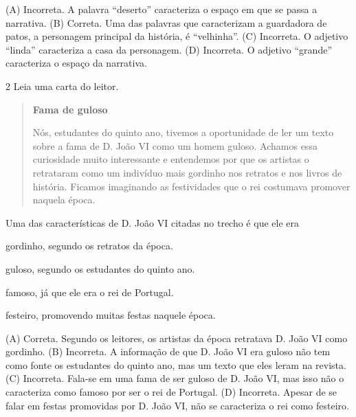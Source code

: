 
(A) Incorreta. A palavra ``deserto'' caracteriza o espaço em que se
passa a narrativa.
(B) Correta. Uma das palavras que caracterizam a
guardadora de patos, a personagem principal da história, é ``velhinha''.
(C) Incorreta. O adjetivo ``linda'' caracteriza a casa da personagem.
(D) Incorreta. O adjetivo ``grande'' caracteriza o espaço da narrativa.

\num{2} Leia uma carta do leitor.

\begin{quote}
\textbf{Fama de guloso}

Nós, estudantes do quinto ano, tivemos a oportunidade de ler um texto sobre a fama de D. João VI como um homem guloso. Achamos essa curiosidade muito interessante e entendemos por que os artistas o retrataram como um indivíduo mais gordinho nos retratos e nos livros de história. Ficamos imaginando as festividades que o rei costumava promover naquela época.

\end{quote}

Uma das características de D. João VI citadas no trecho é que ele era

\begin{escolha}
\item gordinho, segundo os retratos da época.

\item guloso, segundo os estudantes do quinto ano.

\item famoso, já que ele era o rei de Portugal.

\item festeiro, promovendo muitas festas naquele época.
\end{escolha}


(A) Correta. Segundo os leitores, os artistas da época retratava D. João VI como gordinho.
(B) Incorreta. A informação de que D. João VI era guloso não tem como fonte os estudantes do quinto ano, mas um texto que eles leram na revista.
(C) Incorreta. Fala-se em uma fama de ser guloso de D. João VI, mas isso não o caracteriza como famoso por ser o rei de Portugal.
(D) Incorreta. Apesar de se falar em festas promovidas por D. João VI, não se caracteriza o rei como festeiro.

